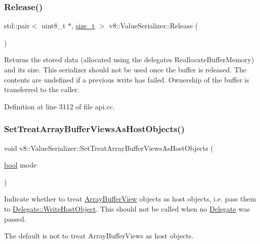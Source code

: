 \subsubsection{\texorpdfstring{Release()}{Release()}}
{\footnotesize\ttfamily std\+::pair$<$ uint8\+\_\+t $\ast$, \mbox{\hyperlink{classsize__t}{size\+\_\+t}} $>$ v8\+::\+Value\+Serializer\+::\+Release (\begin{DoxyParamCaption}{ }\end{DoxyParamCaption})}

Returns the stored data (allocated using the delegate\textquotesingle{}s Reallocate\+Buffer\+Memory) and its size. This serializer should not be used once the buffer is released. The contents are undefined if a previous write has failed. Ownership of the buffer is transferred to the caller. 

Definition at line 3112 of file api.\+cc.

\mbox{\label{classv8_1_1ValueSerializer_ae5e570983dfe928e15d6cc56755248c4}} 
\subsubsection{\texorpdfstring{Set\+Treat\+Array\+Buffer\+Views\+As\+Host\+Objects()}{SetTreatArrayBufferViewsAsHostObjects()}}
{\footnotesize\ttfamily void v8\+::\+Value\+Serializer\+::\+Set\+Treat\+Array\+Buffer\+Views\+As\+Host\+Objects (\begin{DoxyParamCaption}\item[{\mbox{\hyperlink{classbool}{bool}}}]{mode }\end{DoxyParamCaption})}

Indicate whether to treat \mbox{\hyperlink{classv8_1_1ArrayBufferView}{Array\+Buffer\+View}} objects as host objects, i.\+e. pass them to \mbox{\hyperlink{classv8_1_1ValueSerializer_1_1Delegate_a9cdf9bb45300507456548161cbe656b5}{Delegate\+::\+Write\+Host\+Object}}. This should not be called when no \mbox{\hyperlink{classv8_1_1ValueSerializer_1_1Delegate}{Delegate}} was passed.

The default is not to treat Array\+Buffer\+Views as host objects. 


